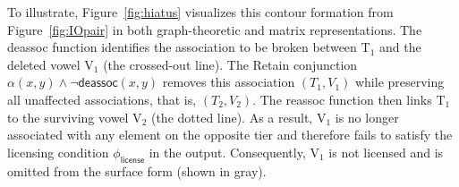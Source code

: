 \documentclass[pmlr]{jmlr}%
\begin{document}
	To illustrate, 
	Figure~\ref{fig:hiatus} visualizes this contour formation from 
	Figure~\ref{fig:IOpair} in both 
	graph-theoretic and matrix representations.
	The \textsf{deassoc} function 
	identifies the association to be broken between T$_1$ and 
	the deleted vowel V$_1$ (the crossed-out line). The \textsf{Retain} conjunction 
	$\alpha(x,y)\land\neg\textsf{deassoc}(x,y)$ removes 
	this association $(T_1,V_1)$ while preserving all unaffected associations, 
	that is, $(T_2,V_2)$. The \textsf{reassoc} function then links T$_1$ to 
	the surviving vowel V$_2$ (the dotted line). As a result, V$_1$ is no longer
	associated with any element on the opposite tier and therefore fails to 
	satisfy the licensing condition $\phi_{\textsf{license}}$ in the output. 
	Consequently, V$_1$ is not licensed and is omitted from 
	the surface form (shown in gray).
\end{document}
